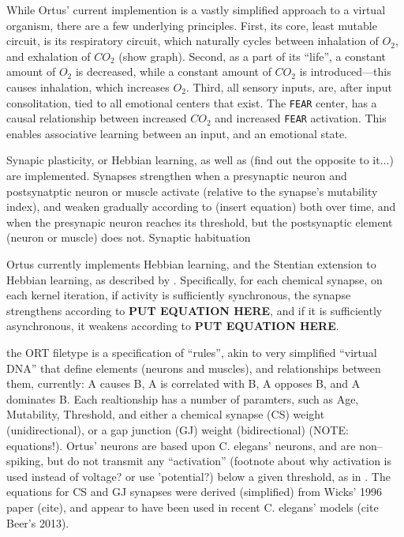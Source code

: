 \documentclass[letterpaper]{article}
\begin{document}
While Ortus' current implemention is a vastly simplified approach to a virtual organism, there are a few underlying principles. First, its core, least mutable circuit, is its respiratory circuit, which naturally cycles between inhalation of $O_2$, and exhalation of $CO_2$ (show graph). Second, as a part of its ``life'', a constant amount of $O_2$ is decreased, while a constant amount of $CO_2$ is introduced---this causes inhalation, which increases $O_2$. Third, all sensory inputs, are, after input consolitation, tied to all emotional centers that exist. The \texttt{FEAR} center, has a causal relationship between increased $CO_2$ and increased \texttt{FEAR} activation. This enables associative learning between an input, and an emotional state.


Synapic plasticity, or Hebbian learning, as well as (find out the opposite to it...) are implemented. Synapses strengthen when a presynaptic neuron and postsynatptic neuron or muscle activate (relative to the synapse's mutability index), and weaken gradually according to (insert equation) both over time, and when the presynapic neuron reaches its threshold, but the postsynaptic element (neuron or muscle) does not.
Synaptic habituation

Ortus currently implements Hebbian learning, and the Stentian extension to Hebbian learning, as described by \cite{Kutsarova2016}. Specifically, for each chemical synapse, on each kernel iteration, if activity is sufficiently synchronous, the synapse strengthens according to \textbf{PUT EQUATION HERE}, and if it is sufficiently asynchronous, it weakens according to \textbf{PUT EQUATION HERE}. 


the ORT filetype is a specification of ``rules'', akin to very simplified ``virtual DNA'' that define elements (neurons and muscles), and relationships between them, currently: A causes B, A is correlated with B, A opposes B, and A dominates B. Each realtionship has a number of paramters, such as Age, Mutability, Threshold, and either a chemical synapse (CS) weight (unidirectional), or a gap junction (GJ) weight (bidirectional) (NOTE: equations!). Ortus' neurons are based upon C. elegans' neurons, and are non--spiking, but do not transmit any ``activation'' (footnote about why activation is used instead of voltage? or use 'potential?) below a given threshold, as in \citep{Graubard1014}. The equations for CS and GJ synapses were derived (simplified) from Wicks' 1996 paper (cite), and appear to have been used in recent C. elegans' models (cite Beer's 2013).
\end{document}
